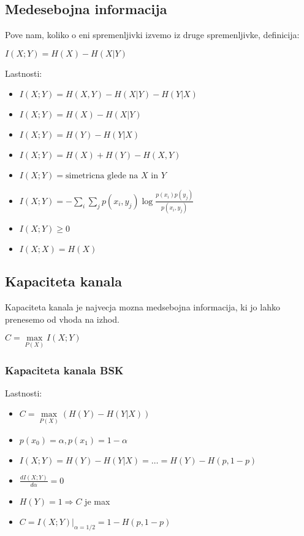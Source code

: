 \documentclass{article}
\begin{document}
\begin{multicols}{3}
\subsection{Medesebojna informacija}
Pove nam, koliko o eni spremenljivki izvemo iz druge spremenljivke,
definicija:
\begin{center}
    \begin{math}
        I(X;Y) = H(X) - H(X|Y)
    \end{math}
\end{center}
Lastnosti:
\begin{itemize}
    \item $I(X;Y) = H(X, Y) - H(X|Y) - H(Y|X)$
    \item $I(X;Y) = H(X) - H(X|Y)$
    \item $I(X;Y) = H(Y) - H(Y|X)$
    \item $I(X;Y) = H(X) + H(Y) - H(X, Y)$
    \item $I(X;Y) = \text{simetricna glede na } X \text{ in } Y$
    \item $I(X;Y) = -\sum_i\sum_j p(x_i, y_j) \log \frac{p(x_i)p(y_j)}{p(x_i, y_j)}$
    \item $I(X;Y) \geq 0$
    \item $I(X;X) = H(X)$
\end{itemize}

\subsection{Kapaciteta kanala}
Kapaciteta kanala je najvecja mozna medsebojna informacija, ki jo lahko prenesemo od vhoda na izhod.
\begin{center}
    $C =\underset{P(X)}{\max} I(X;Y)$
\end{center}
\subsubsection{Kapaciteta kanala BSK}
Lastnosti:
\begin{itemize}
    \item $C =\underset{P(X)}{\max} (H(Y) - H(Y|X))$
    \item $p(x_0) = \alpha, p(x_1) = 1 - \alpha$
    \item $I(X;Y) = H(Y) - H(Y|X) = \dots = H(Y) - H(p, 1-p)$
    \item $\frac{dI(X;Y)}{d \alpha} = 0$
    \item $H(Y) = 1 \Rightarrow C$ je max
    \item $C=I(X;Y) |_{\alpha = 1/2} = 1 - H(p, 1-p)$
\end{itemize}

\end{multicols}
\end{document}
